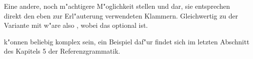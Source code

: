 Eine andere, noch m"achtigere M"oglichkeit stellen  und  dar, sie entsprechen direkt den eben zur Erl"auterung verwendeten
Klammern. Gleichwertig zu der Variante mit  w"are also , wobei das  optional ist.

 k"onnen beliebig komplex sein, ein Beispiel daf"ur findet sich im letzten Abschnitt des Kapitels 5 der Referenzgrammatik.
